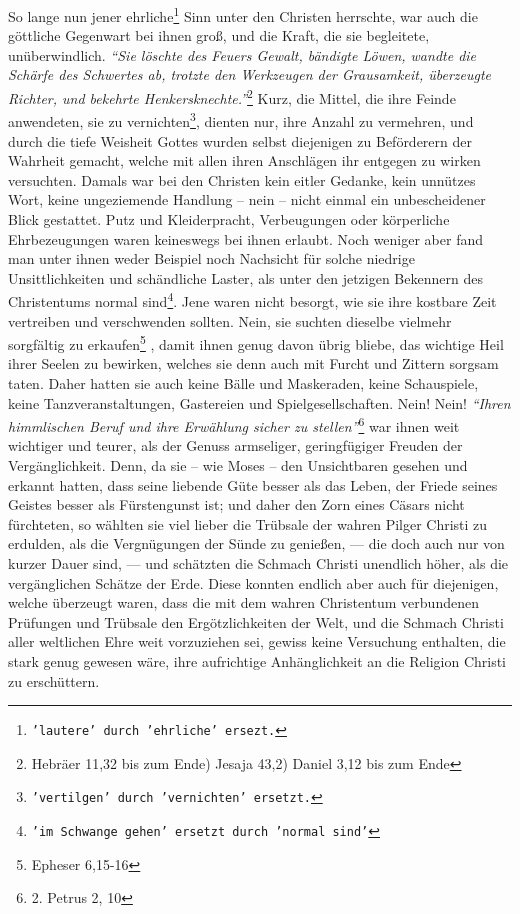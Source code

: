 \medskip

So lange nun jener ehrliche\footnote{\texttt{'lautere' durch 'ehrliche' ersezt.}}
Sinn unter den Christen herrschte, war auch die
göttliche Gegenwart bei ihnen groß, und die Kraft, die sie begleitete,
unüberwindlich.
\textit{"`Sie löschte des Feuers Gewalt, bändigte Löwen,
wandte die Schärfe des Schwertes ab, trotzte den Werkzeugen der Grausamkeit,
überzeugte Richter, und bekehrte Henkersknechte."'}\footnote{Hebräer 11,32 bis
zum Ende) Jesaja 43,2) Daniel 3,12 bis zum Ende}
 
Kurz, die Mittel, die ihre Feinde anwendeten, sie
zu vernichten\footnote{\texttt{'vertilgen' durch 'vernichten' ersetzt.}}, dienten
nur, ihre Anzahl zu vermehren, und durch die tiefe
Weisheit Gottes wurden selbst diejenigen zu Beförderern der Wahrheit gemacht,
welche mit allen ihren Anschlägen ihr entgegen zu wirken versuchten. Damals war
bei den Christen kein eitler Gedanke, kein unnützes Wort, keine ungeziemende
Handlung -- nein -- nicht einmal ein unbescheidener Blick gestattet. Putz und
Kleiderpracht, Verbeugungen oder körperliche Ehrbezeugungen waren keineswegs
bei ihnen erlaubt. Noch weniger aber fand man unter ihnen weder Beispiel noch
Nachsicht für solche niedrige Unsittlichkeiten und schändliche Laster, als unter
den jetzigen Bekennern des Christentums normal sind\footnote{\texttt{'im
Schwange gehen' ersetzt durch 'normal sind'}}.
Jene waren nicht
besorgt, wie sie ihre kostbare Zeit vertreiben und verschwenden sollten. Nein,
sie suchten dieselbe vielmehr sorgfältig zu erkaufen\footnote{Epheser 6,15-16}
,
damit ihnen genug davon übrig bliebe, das wichtige Heil ihrer Seelen zu
bewirken, welches sie denn auch mit Furcht und Zittern sorgsam taten. Daher
hatten sie auch keine Bälle und Maskeraden, keine Schauspiele, keine
Tanzveranstaltungen, Gastereien und Spielgesellschaften. Nein! Nein!
\textit{"`Ihren himmlischen Beruf und ihre Erwählung sicher zu
stellen"'}\footnote{2. Petrus 2, 10}
war ihnen weit wichtiger und teurer, als der Genuss armseliger, geringfügiger
Freuden der Vergänglichkeit. Denn, da sie -- wie Moses -- den Unsichtbaren
gesehen und erkannt hatten, dass seine liebende Güte besser als das Leben,
der Friede seines Geistes besser als Fürstengunst ist; und daher den Zorn eines
Cäsars  nicht fürchteten, so wählten sie viel lieber die
Trübsale
der wahren Pilger  Christi zu erdulden, als die
Vergnügungen der
Sünde zu genießen, — die doch auch nur von kurzer Dauer sind, — und schätzten
die Schmach Christi unendlich höher, als die vergänglichen Schätze der Erde.
Diese konnten endlich aber auch für diejenigen, welche überzeugt waren, dass
die mit dem wahren Christentum verbundenen Prüfungen und Trübsale den
Ergötzlichkeiten der Welt, und die Schmach Christi aller weltlichen Ehre weit
vorzuziehen sei, gewiss keine Versuchung enthalten, die stark genug gewesen
wäre,
ihre aufrichtige Anhänglichkeit an die Religion Christi zu erschüttern.

